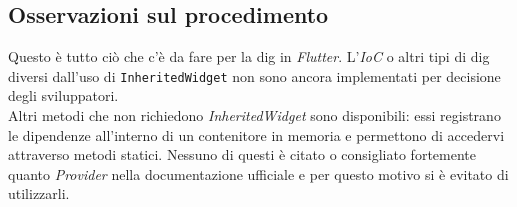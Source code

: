 \subsection{Osservazioni sul procedimento}
\label{subsec:osservazioni-procedimento-flutter}

Questo è tutto ciò che c'è da fare per la \gls{dig} in \emph{Flutter}. L'\emph{IoC} o altri tipi di \gls{dig} diversi dall'uso di \texttt{InheritedWidget} non sono ancora implementati per decisione degli sviluppatori.\\
Altri metodi che non richiedono \emph{InheritedWidget} sono disponibili: essi registrano le dipendenze all'interno di un contenitore in memoria e permettono di accedervi attraverso metodi statici. Nessuno di questi è citato o consigliato fortemente quanto \emph{Provider} nella documentazione ufficiale e per questo motivo si è evitato di utilizzarli.